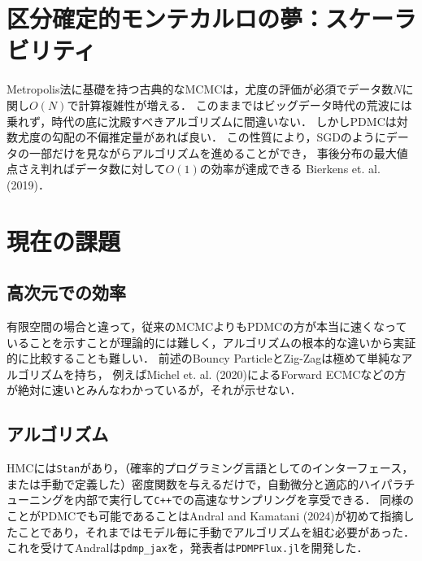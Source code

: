 \documentclass[leqno,a4j]{jarticle}
\numberwithin{equation}{section}
\begin{document}
\section{区分確定的モンテカルロの夢：スケーラビリティ}

Metropolis法に基礎を持つ古典的なMCMCは，尤度の評価が必須でデータ数$N$に関し$O(N)$で計算複雑性が増える．
このままではビッグデータ時代の荒波には乗れず，時代の底に沈殿すべきアルゴリズムに間違いない．
しかしPDMCは対数尤度の勾配の不偏推定量があれば良い．
この性質により，SGDのようにデータの一部だけを見ながらアルゴリズムを進めることができ，
事後分布の最大値点さえ判ればデータ数に対して$O(1)$の効率が達成できる Bierkens et. al. (2019)．

\section{現在の課題}

\subsection{高次元での効率}

有限空間の場合と違って，従来のMCMCよりもPDMCの方が本当に速くなっていることを示すことが理論的には難しく，アルゴリズムの根本的な違いから実証的に比較することも難しい．
前述のBouncy ParticleとZig-Zagは極めて単純なアルゴリズムを持ち，
例えばMichel et. al. (2020)によるForward ECMCなどの方が絶対に速いとみんなわかっているが，それが示せない．

\subsection{アルゴリズム}

HMCには\texttt{Stan}があり，（確率的プログラミング言語としてのインターフェース，または手動で定義した）密度関数を与えるだけで，自動微分と適応的ハイパラチューニングを内部で実行して\texttt{C++}での高速なサンプリングを享受できる．
同様のことがPDMCでも可能であることはAndral and Kamatani (2024)が初めて指摘したことであり，それまではモデル毎に手動でアルゴリズムを組む必要があった．
これを受けてAndralは\texttt{pdmp\_jax}を，発表者は\texttt{PDMPFlux.jl}を開発した．
\end{document}
